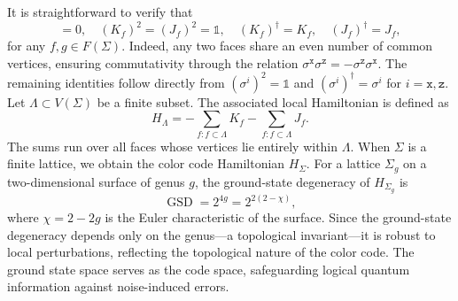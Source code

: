 \documentclass[a4paper,11pt]{article}
\theoremstyle{definition}
\theoremstyle{remark}
\theoremstyle{remark}
\begin{document}
It is straightforward to verify that 
\begin{equation*}
    [K_f, J_g] = 0, \quad  (K_f)^2 = (J_f)^2 = \mathds{1}, \quad  (K_f)^{\dagger} = K_f, \quad (J_f)^{\dagger} = J_f,
\end{equation*}
for any $f, g \in F(\Sigma)$. Indeed, any two faces share an even number of common vertices, ensuring commutativity through the relation $\sigma^{\mathtt{x}} \sigma^{\mathtt{z}} = -\sigma^{\mathtt{z}} \sigma^{\mathtt{x}}$. The remaining identities follow directly from $(\sigma^i)^2 = \mathds{1}$ and $(\sigma^i)^{\dagger} = \sigma^i$ for $i = {\mathtt{x}}, {\mathtt{z}}$.
Let $\Lambda \subset V(\Sigma)$ be a finite subset. The associated local Hamiltonian is defined as 
\begin{equation*}
    H_\Lambda = -\sum_{f:f \subset \Lambda} K_f - \sum_{f:f \subset \Lambda} J_f.
\end{equation*}
The sums run over all faces whose vertices lie entirely within $\Lambda$. When $\Sigma$ is a finite lattice, we obtain the color code Hamiltonian $H_{\Sigma}$. 
For a lattice $\Sigma_g$ on a two-dimensional surface of genus $g$, the ground-state degeneracy of $H_{\Sigma_g}$ is \cite{Bombin2006colorcode,bombin2013introduction}
\begin{equation*}
    \operatorname{GSD} = 2^{4g} = 2^{2(2 - \chi)},
\end{equation*}
where $\chi = 2 - 2g$ is the Euler characteristic of the surface. 
Since the ground-state degeneracy depends only on the genus—a topological invariant—it is robust to local perturbations, reflecting the topological nature of the color code. The ground state space serves as the code space, safeguarding logical quantum information against noise-induced errors.
\end{document}
